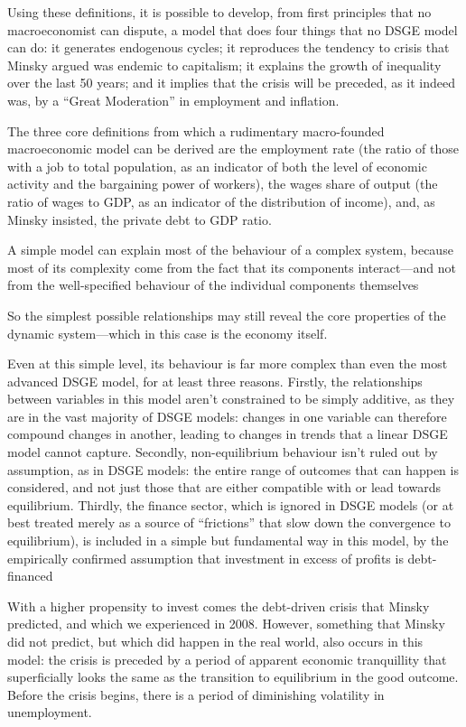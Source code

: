 \documentclass[
]{book}
\begin{document}
Using these definitions, it is possible to develop, from first principles that no macroeconomist can dispute, a model that does four things that no DSGE model can do: it generates endogenous cycles; it reproduces the tendency to crisis that Minsky argued was endemic to capitalism; it explains the growth of inequality over the last 50 years; and it implies that the crisis will be preceded, as it indeed was, by a ``Great Moderation'' in employment and inflation.

The three core definitions from which a rudimentary macro-founded macroeconomic model can be derived are the employment rate (the ratio of those with a job to total population, as an indicator of both the level of economic activity and the bargaining power of workers), the wages share of output (the ratio of wages to GDP, as an indicator of the distribution of income), and, as Minsky insisted, the private debt to GDP ratio.

A simple model can explain most of the behaviour of a complex system, because most of its complexity come from the fact that its components interact---and not from the well-specified behaviour of the individual components themselves

So the simplest possible relationships may still reveal the core properties of the dynamic system---which in this case is the economy itself.

Even at this simple level, its behaviour is far more complex than even the most advanced DSGE model, for at least three reasons. Firstly, the relationships between variables in this model aren't constrained to be simply additive, as they are in the vast majority of DSGE models: changes in one variable can therefore compound changes in another, leading to changes in trends that a linear DSGE model cannot capture. Secondly, non-equilibrium behaviour isn't ruled out by assumption, as in DSGE models: the entire range of outcomes that can happen is considered, and not just those that are either compatible with or lead towards equilibrium. Thirdly, the finance sector, which is ignored in DSGE models (or at best treated merely as a source of ``frictions'' that slow down the convergence to equilibrium), is included in a simple but fundamental way in this model, by the empirically confirmed assumption that investment in excess of profits is debt-financed

With a higher propensity to invest comes the debt-driven crisis that Minsky predicted, and which we experienced in 2008. However, something that Minsky did not predict, but which did happen in the real world, also occurs in this model: the crisis is preceded by a period of apparent economic tranquillity that superficially looks the same as the transition to equilibrium in the good outcome. Before the crisis begins, there is a period of diminishing volatility in unemployment.
\end{document}
